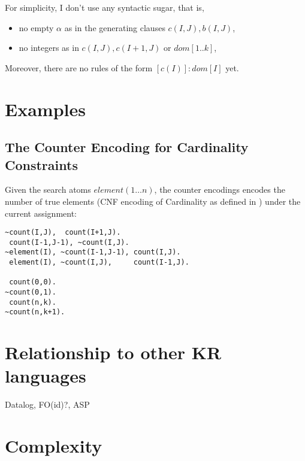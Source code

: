 \documentclass[conference]{IEEEtran}
\begin{document}
{\color{red}For simplicity, I don't use any syntactic sugar, that is,
%
\begin{itemize}

  \item no empty $\alpha$ as in the generating clauses
    $c(I,J),b(I,J)$,

  \item no integers as in $c(I,J),c(I+1,J)$ or $dom[1..k]$,


\end{itemize}
Moreover, there are no rules of the form $[c(I)]:dom[I]$ yet. 
}

\section{Examples}

\subsection{The Counter Encoding for Cardinality Constraints}


Given the search atoms $element(1\ldots n)$, the counter encodings encodes the
number of true elements (CNF encoding of Cardinality as defined in \cite{Sinz05})
under the current assignment:

\begin{lstlisting}
~count(I,J),  count(I+1,J).
 count(I-1,J-1), ~count(I,J).
~element(I), ~count(I-1,J-1), count(I,J).
 element(I), ~count(I,J),     count(I-1,J).

 count(0,0).
~count(0,1).
 count(n,k).
~count(n,k+1).
\end{lstlisting}

\section{Relationship to other KR languages}

Datalog, FO(id)?, ASP

\section{Complexity}



\end{document}
